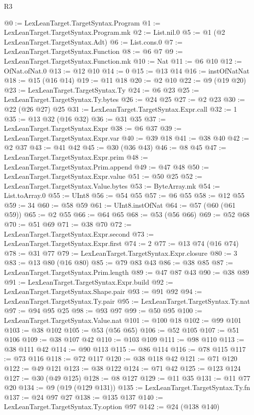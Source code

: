 \begin{lexlean}{R3}
\begin{coremodule}
@0 := LexLeanTarget.TargetSyntax.Program
@1 := LexLeanTarget.TargetSyntax.Program.mk
@2 := List.nil.{0}
@5 := @1 (@2 LexLeanTarget.TargetSyntax.Adt)
@6 := List.cons.{0}
@7 := LexLeanTarget.TargetSyntax.Function
@8 := @6 @7
@9 := LexLeanTarget.TargetSyntax.Function.mk
@10 := Nat
@11 := @6 @10
@12 := OfNat.ofNat.{0}
@13 := @12 @10
@14 := 0
@15 := @13 @14
@16 := instOfNatNat
@18 := @15 (@16 @14)
@19 := @11 @18
@20 := @2 @10
@22 := @9 (@19 @20)
@23 := LexLeanTarget.TargetSyntax.Ty
@24 := @6 @23
@25 := LexLeanTarget.TargetSyntax.Ty.bytes
@26 := @24 @25
@27 := @2 @23
@30 := @22 (@26 @27) @25
@31 := LexLeanTarget.TargetSyntax.Expr.call
@32 := 1
@35 := @13 @32 (@16 @32)
@36 := @31 @35
@37 := LexLeanTarget.TargetSyntax.Expr
@38 := @6 @37
@39 := LexLeanTarget.TargetSyntax.Expr.var
@40 := @39 @18
@41 := @38 @40
@42 := @2 @37
@43 := @41 @42
@45 := @30 (@36 @43)
@46 := @8 @45
@47 := LexLeanTarget.TargetSyntax.Expr.prim
@48 := LexLeanTarget.TargetSyntax.Prim.append
@49 := @47 @48
@50 := LexLeanTarget.TargetSyntax.Expr.value
@51 := @50 @25
@52 := LexLeanTarget.TargetSyntax.Value.bytes
@53 := ByteArray.mk
@54 := List.toArray.{0}
@55 := UInt8
@56 := @54 @55
@57 := @6 @55
@58 := @12 @55
@59 := 34
@60 := @58 @59
@61 := UInt8.instOfNat
@64 := @57 (@60 (@61 @59))
@65 := @2 @55
@66 := @64 @65
@68 := @53 (@56 @66)
@69 := @52 @68
@70 := @51 @69
@71 := @38 @70
@72 := LexLeanTarget.TargetSyntax.Expr.second
@73 := LexLeanTarget.TargetSyntax.Expr.first
@74 := 2
@77 := @13 @74 (@16 @74)
@78 := @31 @77
@79 := LexLeanTarget.TargetSyntax.Expr.closure
@80 := 3
@83 := @13 @80 (@16 @80)
@85 := @79 @83 @43
@86 := @38 @85
@87 := LexLeanTarget.TargetSyntax.Prim.length
@89 := @47 @87 @43
@90 := @38 @89
@91 := LexLeanTarget.TargetSyntax.Expr.build
@92 := LexLeanTarget.TargetSyntax.Shape.pair
@93 := @91 @92
@94 := LexLeanTarget.TargetSyntax.Ty.pair
@95 := LexLeanTarget.TargetSyntax.Ty.nat
@97 := @94 @95 @25
@98 := @93 @97
@99 := @50 @95
@100 := LexLeanTarget.TargetSyntax.Value.nat
@101 := @100 @18
@102 := @99 @101
@103 := @38 @102
@105 := @53 (@56 @65)
@106 := @52 @105
@107 := @51 @106
@109 := @38 @107 @42
@110 := @103 @109
@111 := @98 @110
@113 := @38 @111 @42
@114 := @90 @113
@115 := @86 @114
@116 := @78 @115
@117 := @73 @116
@118 := @72 @117
@120 := @38 @118 @42
@121 := @71 @120
@122 := @49 @121
@123 := @38 @122
@124 := @71 @42
@125 := @123 @124
@127 := @30 (@49 @125)
@128 := @8 @127
@129 := @11 @35
@131 := @11 @77 @20
@134 := @9 (@19 (@129 @131))
@135 := LexLeanTarget.TargetSyntax.Ty.fn
@137 := @24 @97 @27
@138 := @135 @137
@140 := LexLeanTarget.TargetSyntax.Ty.option @97
@142 := @24 (@138 @140)

\end{coremodule}
\end{lexlean}
